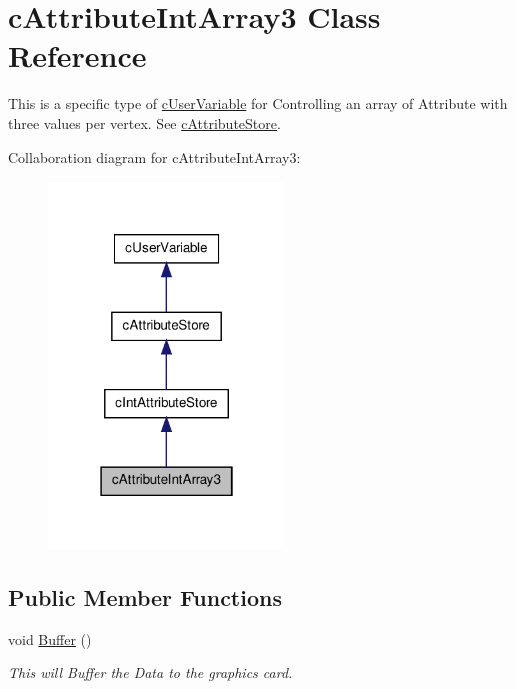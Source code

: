 \hypertarget{classc_attribute_int_array3}{
\section{cAttributeIntArray3 Class Reference}
\label{classc_attribute_int_array3}
}


This is a specific type of \hyperlink{classc_user_variable}{cUserVariable} for Controlling an array of Attribute with three values per vertex. See \hyperlink{classc_attribute_store}{cAttributeStore}.  




Collaboration diagram for cAttributeIntArray3:\nopagebreak
\begin{figure}[H]
\begin{center}
\leavevmode
\includegraphics[width=178pt]{classc_attribute_int_array3__coll__graph}
\end{center}
\end{figure}
\subsection*{Public Member Functions}
\begin{DoxyCompactItemize}
\item 
\hypertarget{classc_attribute_int_array3_a53325ec4bacecc7e016061ddab411c23}{
void \hyperlink{classc_attribute_int_array3_a53325ec4bacecc7e016061ddab411c23}{Buffer} ()}
\label{classc_attribute_int_array3_a53325ec4bacecc7e016061ddab411c23}

\begin{DoxyCompactList}\small\item\em This will Buffer the Data to the graphics card. \end{DoxyCompactList}\end{DoxyCompactItemize}



